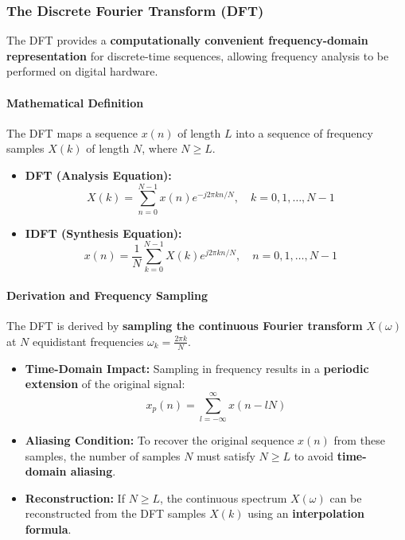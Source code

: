 \hypertarget{the-discrete-fourier-transform-dft}{%
\subsubsection{The Discrete Fourier Transform
(DFT)}\label{the-discrete-fourier-transform-dft}}

The DFT provides a \textbf{computationally convenient frequency-domain
representation} for discrete-time sequences, allowing frequency analysis
to be performed on digital hardware.

\hypertarget{mathematical-definition}{%
\paragraph{Mathematical Definition}\label{mathematical-definition}}

The DFT maps a sequence \(x(n)\) of length \(L\) into a sequence of
frequency samples \(X(k)\) of length \(N\), where \(N \ge L\).

\begin{itemize}
\tightlist
\item
  \textbf{DFT (Analysis Equation):}
  \[X(k) = \sum_{n=0}^{N-1} x(n)e^{-j2\pi kn/N}, \quad k = 0, 1, \dots, N-1 \quad\]
\item
  \textbf{IDFT (Synthesis Equation):}
  \[x(n) = \frac{1}{N} \sum_{k=0}^{N-1} X(k)e^{j2\pi kn/N}, \quad n = 0, 1, \dots, N-1 \quad\]
\end{itemize}

\hypertarget{derivation-and-frequency-sampling}{%
\paragraph{Derivation and Frequency
Sampling}\label{derivation-and-frequency-sampling}}

The DFT is derived by \textbf{sampling the continuous Fourier transform}
\(X(\omega)\) at \(N\) equidistant frequencies
\(\omega_k = \frac{2\pi k}{N}\).

\begin{itemize}
\tightlist
\item
  \textbf{Time-Domain Impact:} Sampling in frequency results in a
  \textbf{periodic extension} of the original signal:
  \[x_p(n) = \sum_{l=-\infty}^{\infty} x(n-lN)\]
\item
  \textbf{Aliasing Condition:} To recover the original sequence \(x(n)\)
  from these samples, the number of samples \(N\) must satisfy
  \textbf{\(N \ge L\)} to avoid \textbf{time-domain aliasing}.
\item
  \textbf{Reconstruction:} If \(N \ge L\), the continuous spectrum
  \(X(\omega)\) can be reconstructed from the DFT samples \(X(k)\) using
  an \textbf{interpolation formula}.
\end{itemize}


